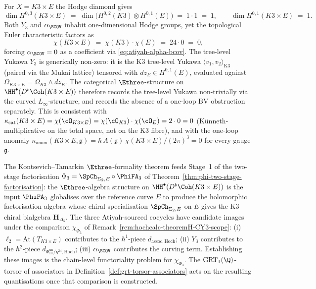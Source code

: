\begin{remark}[Verification at \texorpdfstring{$X = K3 \times E$}{X = K3 x E}]
\label{rem:three-cocycles-K3xE}
For $X = K3 \times E$ the Hodge diamond gives
\[
 \dim H^{0,3}(K3 \times E) \;=\; \dim\!\big(H^{0,2}(K3) \otimes H^{0,1}(E)\big) \;=\; 1 \cdot 1 \;=\; 1, \qquad \dim H^{0,1}(K3 \times E) \;=\; 1.
\]
Both $Y_3$ and $\alpha_{\BCOV}$ inhabit one-dimensional Hodge groups, yet the topological Euler characteristic factors as
\[
 \chi(K3 \times E) \;=\; \chi(K3) \cdot \chi(E) \;=\; 24 \cdot 0 \;=\; 0,
\]
forcing $\alpha_{\BCOV} = 0$ as a coefficient via \eqref{eq:atiyah-alpha-bcov}. The tree-level Yukawa $Y_3$ is generically non-zero: it is the K3 tree-level Yukawa $\langle v_1, v_2 \rangle_{\mathrm{K3}}$ (paired via the Mukai lattice) tensored with $dz_E \in H^{0,1}(E)$, evaluated against $\Omega_{K3 \times E} = \Omega_{K3} \wedge dz_E$. The categorical $\Ethree$-structure on $\HH^\bullet(D^b\Coh(K3 \times E))$ therefore records the tree-level Yukawa non-trivially via the curved $L_\infty$-structure, and records the absence of a one-loop BV obstruction separately. This is consistent with $\kappa_{\mathrm{cat}}(K3 \times E) = \chi(\cO_{K3 \times E}) = \chi(\cO_{K3}) \cdot \chi(\cO_E) = 2 \cdot 0 = 0$ (K\"unneth-multiplicative on the total space, not on the K3 fibre), and with the one-loop anomaly $\kappa_{\mathrm{anom}}(K3 \times E, \mathfrak g) = \hbar\, A(\mathfrak g)\, \chi(K3 \times E)/(2\pi)^3 = 0$ for every gauge $\mathfrak g$.
\end{remark}

\begin{remark}
\label{rem:kt-to-hdelta5}
The Kontsevich--Tamarkin $\Ethree$-formality theorem feeds Stage~1 of the two-stage factorisation $\Phi_3 = \SpCh_{\Sigma_2, E} \circ \PhiFA_3$ of Theorem~\ref{thm:phi-two-stage-factorisation}: the $\Ethree$-algebra structure on $\HH^\bullet(D^b\Coh(K3 \times E))$ is the input $\PhiFA_3$ globalises over the reference curve $E$ to produce the holomorphic factorisation algebra whose chiral specialisation $\SpCh_{\Sigma_2, E}$ on $E$ gives the K3 chiral bialgebra $\mathbf H_{\Delta_5}$. The three Atiyah-sourced cocycles have candidate images under the comparison $\chi_{\Phi_3}$ of Remark~\ref{rem:hochcalc-theoremH-CY3-scope}: (i) $\ell_2 = \mathrm{At}(T_{K3 \times E})$ contributes to the $\hbar^1$-piece $d_{\mathrm{assoc,Hoch}}$; (ii) $Y_3$ contributes to the $\hbar^2$-piece $d_{\Phi_{10}^{\mathrm{un}}/\eta^{24}, \mathrm{Hoch}}$; (iii) $\alpha_{\BCOV}$ contributes the curving term.  Establishing these images is the chain-level functoriality problem for $\chi_{\Phi_3}$.  The $\mathrm{GRT}_1(\Q)$-torsor of associators in Definition~\ref{def:grt-torsor-associators} acts on the resulting quantisations once that comparison is constructed.
\end{remark}


